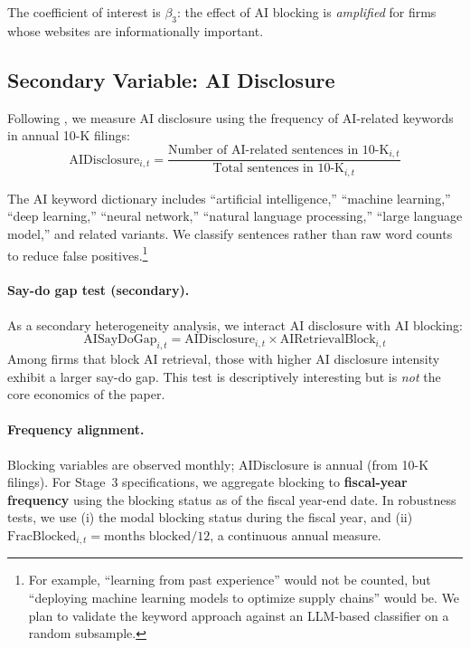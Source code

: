 \documentclass[12pt,a4paper]{article}
\begin{document}
\noindent The coefficient of interest is $\beta_3$: the effect of AI blocking is \emph{amplified} for firms whose websites are informationally important.

\subsection{Secondary Variable: AI Disclosure}

Following \citet{CaoLiuQiuZhao2024}, we measure AI disclosure using the frequency of AI-related keywords in annual 10-K filings:
\begin{equation}
\text{AIDisclosure}_{i,t} = \frac{\text{Number of AI-related sentences in 10-K}_{i,t}}{\text{Total sentences in 10-K}_{i,t}}
\end{equation}

\noindent The AI keyword dictionary includes ``artificial intelligence,'' ``machine learning,'' ``deep learning,'' ``neural network,'' ``natural language processing,'' ``large language model,'' and related variants. We classify sentences rather than raw word counts to reduce false positives.\footnote{For example, ``learning from past experience'' would not be counted, but ``deploying machine learning models to optimize supply chains'' would be. We plan to validate the keyword approach against an LLM-based classifier on a random subsample.}

\paragraph{Say-do gap test (secondary).} As a secondary heterogeneity analysis, we interact AI disclosure with AI blocking:
\begin{equation}
\text{AISayDoGap}_{i,t} = \text{AIDisclosure}_{i,t} \times \text{AIRetrievalBlock}_{i,t}
\end{equation}
\noindent Among firms that block AI retrieval, those with higher AI disclosure intensity exhibit a larger say-do gap. This test is descriptively interesting but is \emph{not} the core economics of the paper.

\paragraph{Frequency alignment.} Blocking variables are observed monthly; AIDisclosure is annual (from 10-K filings). For Stage~3 specifications, we aggregate blocking to \textbf{fiscal-year frequency} using the blocking status as of the fiscal year-end date. In robustness tests, we use (i) the modal blocking status during the fiscal year, and (ii) $\text{FracBlocked}_{i,t} = \text{months blocked}/12$, a continuous annual measure.
\end{document}
